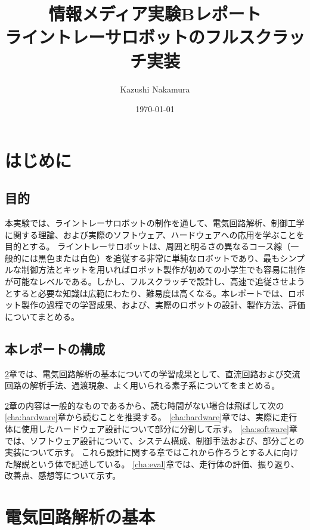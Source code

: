 \documentclass{ltjsreport}
\title{情報メディア実験Bレポート\\ライントレーサロボットのフルスクラッチ実装}
\author{Kazushi Nakamura}
\date{\today}
\begin{document}
\maketitle



\tableofcontents

\chapter{はじめに}


\section{目的}
本実験では、ライントレーサロボットの制作を通して、電気回路解析、制御工学に関する理論、および実際のソフトウェア、ハードウェアへの応用を学ぶことを目的とする。
ライントレーサロボットは、周囲と明るさの異なるコース線（一般的には黒色または白色）を追従する非常に単純なロボットであり、最もシンプルな制御方法とキットを用いればロボット製作が初めての小学生でも容易に制作が可能なレベルである。しかし、フルスクラッチで設計し、高速で追従させようとすると必要な知識は広範にわたり、難易度は高くなる。本レポートでは、ロボット製作の過程での学習成果、および、実際のロボットの設計、製作方法、評価についてまとめる。

\section{本レポートの構成}
\ref{cha:electric}章では、電気回路解析の基本についての学習成果として、直流回路および交流回路の解析手法、過渡現象、よく用いられる素子系についてをまとめる。

\ref{cha:electric}章の内容は一般的なものであるから、読む時間がない場合は飛ばして次の\ref{cha:hardware}章から読むことを推奨する。
\ref{cha:hardware}章では、実際に走行体に使用したハードウェア設計について部分に分割して示す。
\ref{cha:software}章では、ソフトウェア設計について、システム構成、制御手法および、部分ごとの実装について示す。
これら設計に関する章ではこれから作ろうとする人に向けた解説という体で記述している。
\ref{cha:eval}章では、走行体の評価、振り返り、改善点、感想等について示す。

\chapter{電気回路解析の基本}\label{cha:electric}
\end{document}
